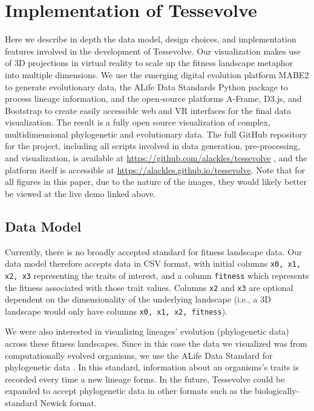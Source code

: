 \section{Implementation of Tessevolve}

Here we describe in depth the data model, design choices, and implementation features involved in the development of Tessevolve. Our visualization makes use of 3D projections in virtual reality to scale up the fitness landscape metaphor into multiple dimensions. We use the emerging digital evolution platform MABE2 to generate evolutionary data, the ALife Data Standards Python package to process lineage information, and the open-source platforms A-Frame, D3.js, and Bootstrap to create easily accessible web and VR interfaces for the final data visualization. The result is a fully open source visualization of complex, multidimensional phylogenetic and evolutionary data. The full GitHub repository for the project, including all scripts involved in data generation, pre-processing, and visualization, is available at \url{https://github.com/alackles/tessevolve} \citep{ackles_alacklestessevolve_2022}, and the platform itself is accessible at \url{https://alackles.github.io/tessevolve}. Note that for all figures in this paper, due to the nature of the images, they would likely better be viewed at the live demo linked above.

\subsection{Data Model}

Currently, there is no broadly accepted standard for fitness landscape data. Our data model therefore accepts data in CSV format, with initial columns \texttt{x0, x1, x2, x3} representing the traits of interest, and a column \texttt{fitness} which represents the fitness associated with those trait values. Columns \texttt{x2} and \texttt{x3} are optional dependent on the dimensionality of the underlying landscape (i.e., a 3D landscape would only have columns \texttt{x0, x1, x2, fitness}). 

We were also interested in visualizing lineages' evolution (phylogenetic data) across these fitness landscapes. Since in this case the data we visualized was from computationally evolved organisms, we use the ALife Data Standard for phylogenetic data \citep{lalejini_data_2019}. In this standard, information about an organisms's traits is recorded every time a new lineage forms. In the future, Tessevolve could be expanded to accept phylogenetic data in other formats such as the biologically-standard Newick format.

